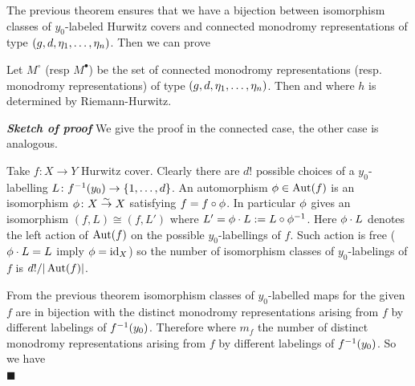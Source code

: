 \documentclass[10pt]{beamer}
\begin{document}
\begin{frame}

The previous theorem ensures that we have a bijection between isomorphism classes of $y_0$-labeled Hurwitz covers and connected monodromy representations of type $(g,d,\eta_1,\ldots,\eta_n)$. Then we can prove

\begin{theorem}
	Let $M^\circ$ (resp $M^\bullet$) be the set of connected monodromy representations (resp. monodromy representations) of type $(g,d,\eta_1,\ldots,\eta_n)$. Then
	and
	where $h$ is determined by Riemann-Hurwitz. 
\end{theorem}

\emph{\bf Sketch of proof}
	We give the proof in the connected case, the other case is analogous. 

\end{frame}

\begin{frame}


	
	Take $f\colon X\to Y$ Hurwitz cover. Clearly there are $d!$ possible choices of a $y_0$-labelling $L\colon f^{-1}(y_0)\to \{1,\ldots,d\}$. An automorphism $\phi\in\operatorname{Aut}(f)$ is an isomorphism $\phi\colon X\overset\sim\to X$ satisfying $f=f\circ\phi$. In particular $\phi$ gives an isomorphism $(f,L)\cong(f,L')$ where $L'=\phi\cdot L:=L\circ\phi^{-1}$. Here $\phi\cdot L$ denotes the left action of $\operatorname{Aut}(f)$ on the possible $y_0$-labellings of $f$. Such action is free (\ie $\phi\cdot L=L$ imply $\phi=\textrm{id}_X$) so the number of isomorphism classes of $y_0$-labelings of $f$ is $d!/|\operatorname{Aut}(f)|$. 
	
	From the previous theorem isomorphism classes of $y_0$-labelled maps for the given $f$ are in bijection with the distinct monodromy representations arising from $f$ by different labelings of $f^{-1}(y_0)$. Therefore 
	where $m_f$ the number of distinct monodromy representations arising from $f$ by different labelings of $f^{-1}(y_0)$. So we have
	\\[-5mm]
	\hfill$\blacksquare$
\end{frame}
\end{document}
